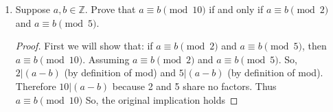 \documentclass{article}
\newcommand{\ints}{\mathbb{Z}}
\begin{document}
\begin{enumerate}
\begin{proof}
			\textbf{case 2:} $y = x^2$ \\
			Consider $x^4 + x^3$, 
			\begin{align*}
				x^4+x^3 &= x^4 + x^3\\
				        &= (x^2)^2+(x^2)x & \text{(by factoring)}\\
				        &= y^2+yx & \text{(by substitution)}\\
				        \\
			x^4+x^3 &= x^4 + x^3\\
					&= x^2(x^2)+x^3 & \text{(by factoring)}\\
					&= x^2y+x^3 & \text{(by substitution)}.
			\end{align*} 
			Thus, $x^3+x^2y =y^3+xy$ when $y=x^2$. 
			since both cases hold so does the original implication.
			
			next consider the implication: if $x^3 + x^2y=y^2 +xy$, then  $y = x^2$ or $y = -x$.
			Assume for the sake of contradiction that:
			$x^3 + x^2y=y^2 +xy$ and $y \neq x^2$ and $y \neq -x$. 
			Since,
			\begin{align*}
				x^3 + x^2y &= y^2 +xy\\
				x^2(x+y) &= y(x+y) & \text{(by factoring)}\\
				\frac{x^2(x+y)}{(x+y)} &= \frac{y(x+y)}{(x+y)} & \text{(since } y \neq -x\text{)}\ \\
				x^2 &= y.
			\end{align*}
			Which is a contradiction therefore the original implication holds.
			
			Since, $y = x^2$ or $y = -x$, implies $x^3 + x^2y=y^2 +xy$ and $x^3 + x^2y=y^2 +xy$, implies $y = x^2$ or $y = -x$ the original statement holds
			
		\end{proof}
		
		
		
		\setcounter{enumi}{7}
		\item Suppose $a,b \in \ints$. Prove that $a \equiv b \pmod{10}$ if and only if  $a \equiv b \pmod{2}$ and $a \equiv b \pmod{5}$.
		\begin{proof}
			First we will show that: if  $a \equiv b \pmod{2}$ and $a \equiv b \pmod{5}$, then  $a \equiv b \pmod{10}$. Assuming $a \equiv b \pmod{2}$ and $a \equiv b \pmod{5}$. So, $2|(a-b)$ (by definition of mod) and $5|(a-b)$ (by definition of mod). Therefore  $10|(a-b)$ because 2 and 5 share no factors. Thus $a \equiv b \pmod{10}$ So, the original implication holds  
		

\end{proof}
\end{enumerate}
\end{document}
